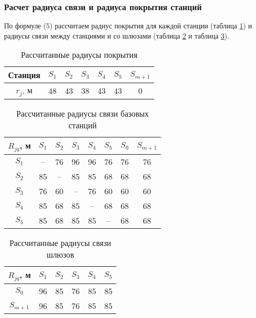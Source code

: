 \subsubsection{Расчет радиуса связи и радиуса покрытия станций}

По формуле (5) рассчитаем радиус покрытия для каждой станции (таблица \cref{tab:part4_sta_coverage}) и радиусы связи между станциями и со шлюзами (таблица \cref{tab:part4_sta_link} и таблица \cref{tab:part4_gateway_link}).

\begin{table}[h!]\centering
  \begin{tabular}{|c||c c c c c c|}\hline
      
      Станция&	$S_1$& $S_2$& $S_3$& $S_4$& $S_5$& $S_{m+1}$\\
      \hline
      $r_j$, м&	48&	43&	38&	43&	43&	0\\
      \hline

\end{tabular}\caption{Рассчитанные радиусы покрытия}\label{tab:part4_sta_coverage}
\end{table}

\begin{table}[h!]\centering
  \begin{tabular}{|c|c c c c c c c|}\hline
      
      $R_{jq}$, м&	$S_1$& $S_2$& $S_3$& $S_4$& $S_5$& $S_0$& $S_{m+1}$\\
      \hline
      $S_1$& --&	76&	96&	96&	76&	76&	76\\
      $S_2$& 85&	--&	85&	85&	68&	68&	68\\
      $S_3$& 76&	60&	--&	76&	60&	60&	60\\
      $S_4$& 85&	68&	85&	--&	68&	68&	68\\
      $S_5$& 85&	68&	85&	85&	--&	68&	68\\

      \hline
\end{tabular}\caption{Рассчитанные радиусы связи базовых станций}\label{tab:part4_sta_link}
\end{table}

\begin{table}[h!]\centering
  \begin{tabular}{|c|c c c c c|}\hline
      
      $R_{jq}$, м&	$S_1$& $S_2$& $S_3$& $S_4$& $S_5$ \\
      \hline
      $S_0$& 96&	85&	76&	85&	85\\
      $S_{m+1}$& 96&	85&	76&	85&	85\\
      \hline
\end{tabular}\caption{Рассчитанные радиусы связи шлюзов}\label{tab:part4_gateway_link}
\end{table}


